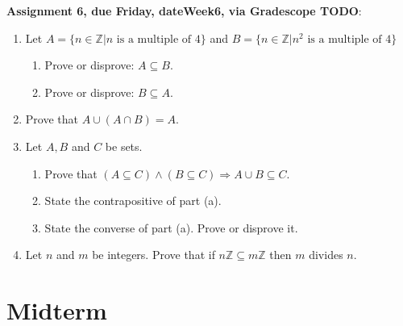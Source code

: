 \documentclass[12pt]{article}
\newcommand{\Z}{{\mathbb Z}}
\begin{document}
\noindent \textbf{Assignment 6, due Friday, \csname dateWeek6\endcsname, via Gradescope TODO}:
\begin{enumerate}
\item Let $A = \{ n \in \Z | n \text{ is a multiple of } 4\}$ and $B = \{ n \in \Z | n^2 \text{ is a multiple of } 4\}$ 
 \begin{enumerate}
 \item Prove or disprove: $A \subseteq B$. 
 \item Prove or disprove: $B \subseteq A$. 
 \end{enumerate}

\item Prove that $A \cup (A \cap B) = A.$
\item Let $A,B$ and $C$ be sets. 
 \begin{enumerate}
 \item Prove that $(A \subseteq C) \wedge (B \subseteq C) \Rightarrow A \cup B \subseteq C$.
 \item State the contrapositive of part (a).
 \item State the converse of part (a). Prove or disprove it.
 \end{enumerate}
\item Let $n$ and $m$ be integers. Prove that if $n\Z \subseteq m\Z$ then $m$ divides $n$.
\end{enumerate}



\newpage
\section[ (October 13) Midterm]{Midterm}
\end{document}
